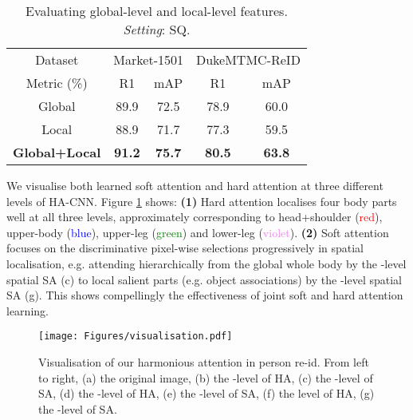 \documentclass[10pt,twocolumn,letterpaper]{article}
\begin{document}
\vspace{-0.3cm}
\begin{table} [!h]
	\centering
\renewcommand{\arraystretch}{1.2}
	\setlength{\tabcolsep}{0.2 cm}
\caption{Evaluating global-level and local-level features. {\em Setting}: SQ.
	}
	\vskip 1pt \begin{tabular}{|c|cc|cc|}
		\hline
		Dataset &  \multicolumn{2}{c|}{Market-1501} &\multicolumn{2}{c|}{DukeMTMC-ReID} \\ \cline{1-5}
		Metric (\%)    & R1 & mAP & R1 & mAP  \\ \hline \hline
		Global &  89.9 &  72.5  &  78.9 &  60.0\\ Local &  88.9 &  71.7  &  77.3 &  59.5\\ \bf Global+Local & \bf 91.2 & \bf 75.7  & \bf 80.5 & \bf 63.8\\ 
		\hline
	\end{tabular}\label{tab:G_L}
	\vspace{-0.3cm}
\end{table}


\vspace{-0.2cm}
 We visualise both learned soft attention and hard attention at three different levels of HA-CNN. Figure \ref{fig:visa} shows:  {\bf (1)} 
Hard attention localises four body parts well at all three levels,
approximately corresponding to head+shoulder (\textcolor{red}{red}), upper-body (\textcolor{blue}{blue}), upper-leg (\textcolor{green}{green})
and lower-leg (\textcolor{violet}{violet}). {\bf (2)} Soft attention focuses on the discriminative pixel-wise selections progressively in spatial localisation, e.g. attending hierarchically from the global whole body by the -level spatial SA (c) to local salient parts (e.g. object associations) by the -level spatial SA (g). This shows compellingly the effectiveness of joint soft and hard attention learning.
\vspace{-0.3cm}
\begin{figure}[!h]
	\centering
	\vspace{-.3cm}
	\texttt{[image: Figures/visualisation.pdf]}
	\vspace{-.3cm}
	\caption{Visualisation of our harmonious attention in person re-id.
		From left to right, (a) the original image, (b) the -level
                of HA, (c) the -level of SA,
                (d) the -level of HA, 
		(e) the -level of SA,  (f) the level of
                  HA, (g) the -level of SA.
	}
	\label{fig:visa}
	\vspace{0.02cm}
\end{figure}
\end{document}
